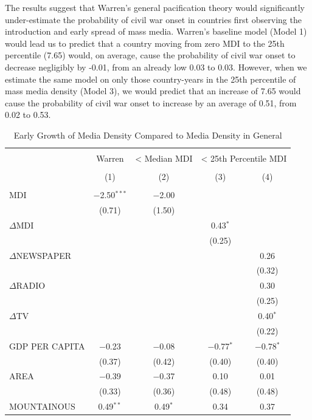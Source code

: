 \documentclass[11pt,article,oneside]{memoir}
\begin{document}
The results suggest that Warren's general pacification theory would
significantly under-estimate the probability of civil war onset in
countries first observing the introduction and early spread of mass
media. Warren's baseline model (Model 1) would lead us to predict that a
country moving from zero MDI to the 25th percentile (7.65) would, on
average, cause the probability of civil war onset to decrease negligibly
by -0.01, from an already low 0.03 to 0.03. However, when we estimate
the same model on only those country-years in the 25th percentile of
mass media density (Model 3), we would predict that an increase of 7.65
would cause the probability of civil war onset to increase by an average
of 0.51, from 0.02 to 0.53.

\begin{table}[!htbp] \centering 
  \caption{Early Growth of Media Density Compared to Media Density in General} 
  \label{} 
\scriptsize 
\begin{tabular}{@{\extracolsep{5pt}}lcccc} 
\\[-1.8ex]\hline \\[-1.8ex] 
 & Warren & < Median MDI & \multicolumn{2}{c}{< 25th Percentile MDI} \\ 
\\[-1.8ex] & (1) & (2) & (3) & (4)\\ 
\hline \\[-1.8ex] 
 MDI & $-$2.50$^{***}$ & $-$2.00 &  &  \\ 
  & (0.71) & (1.50) &  &  \\ 
  $\Delta$MDI &  &  & 0.43$^{*}$ &  \\ 
  &  &  & (0.25) &  \\ 
  $\Delta$NEWSPAPER &  &  &  & 0.26 \\ 
  &  &  &  & (0.32) \\ 
  $\Delta$RADIO &  &  &  & 0.30 \\ 
  &  &  &  & (0.25) \\ 
  $\Delta$TV &  &  &  & 0.40$^{*}$ \\ 
  &  &  &  & (0.22) \\ 
  GDP PER CAPITA & $-$0.23 & $-$0.08 & $-$0.77$^{*}$ & $-$0.78$^{*}$ \\ 
  & (0.37) & (0.42) & (0.40) & (0.40) \\ 
  AREA & $-$0.39 & $-$0.37 & 0.10 & 0.01 \\ 
  & (0.33) & (0.36) & (0.48) & (0.48) \\ 
  MOUNTAINOUS & 0.49$^{**}$ & 0.49$^{*}$ & 0.34 & 0.37 \\ 

\end{tabular}
\end{table}
\end{document}
